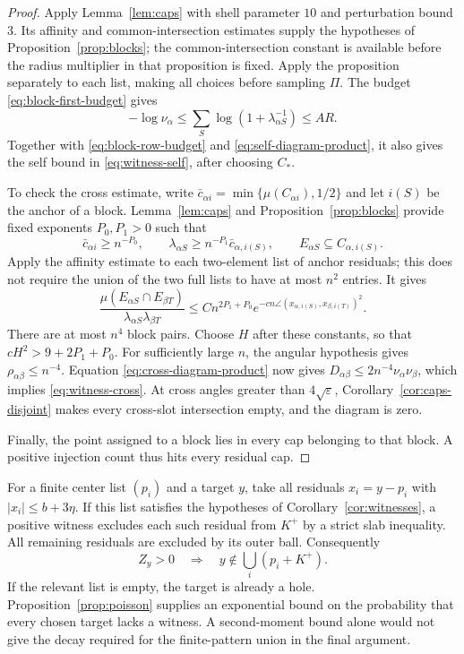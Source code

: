 \begin{proof}
Apply Lemma~\ref{lem:caps} with shell parameter $10$ and perturbation
bound $3$. Its affinity and common-intersection estimates supply the
hypotheses of Proposition~\ref{prop:blocks}; the common-intersection
constant is available before the radius multiplier in that proposition
is fixed. Apply the proposition separately to each list, making all
choices before sampling $\Pi$. The budget
\eqref{eq:block-first-budget} gives
\[
 -\log\nu_\alpha
 \le\sum_S\log(1+\lambda_{\alpha S}^{-1})\le AR.
\]
Together with \eqref{eq:block-row-budget} and
\eqref{eq:self-diagram-product}, it also gives the self bound in
\eqref{eq:witness-self}, after choosing $C_*$.

To check the cross estimate, write
$\bar c_{\alpha i}=\min\{\mu(C_{\alpha i}),1/2\}$ and let
$i(S)$ be the anchor of a block. Lemma~\ref{lem:caps} and
Proposition~\ref{prop:blocks} provide fixed exponents $P_0,P_1>0$
such that
\[
 \bar c_{\alpha i}\ge n^{-P_0},\qquad
 \lambda_{\alpha S}\ge n^{-P_1}\bar c_{\alpha,i(S)},\qquad
 E_{\alpha S}\subseteq C_{\alpha,i(S)}.
\]
Apply the affinity estimate to each two-element list of anchor residuals;
this does not require the union of the two full lists to have at most
$n^2$ entries. It gives
\[
 \frac{\mu(E_{\alpha S}\cap E_{\beta T})}
      {\lambda_{\alpha S}\lambda_{\beta T}}
 \le Cn^{2P_1+P_0}
       e^{-c n\angle(x_{\alpha,i(S)},x_{\beta,i(T)})^2}.
\]
There are at most $n^4$ block pairs. Choose $H$ after these constants,
so that $cH^2>9+2P_1+P_0$. For sufficiently large $n$, the angular
hypothesis gives $\rho_{\alpha\beta}\le n^{-4}$. Equation
\eqref{eq:cross-diagram-product} now gives
$D_{\alpha\beta}\le2n^{-4}\nu_\alpha\nu_\beta$, which implies
\eqref{eq:witness-cross}. At cross angles greater than
$4\sqrt\varepsilon$, Corollary~\ref{cor:caps-disjoint}
makes every cross-slot intersection empty, and the diagram is zero.

Finally, the point assigned to a block lies in every cap belonging to
that block. A positive injection count thus hits every residual cap.
\end{proof}

For a finite center list $(p_i)$ and a target $y$, take all residuals
$x_i=y-p_i$ with $|x_i|\le b+3\eta$. If this list satisfies the
hypotheses of Corollary~\ref{cor:witnesses}, a positive witness excludes
each such residual from $K^+$ by a strict slab inequality. All remaining
residuals are excluded by its outer ball. Consequently
\begin{equation}
 Z_y>0\quad\Longrightarrow\quad
 y\notin\bigcup_i(p_i+K^+).
 \label{eq:witness-hole}
\end{equation}
If the relevant list is empty, the target is already a hole.
Proposition~\ref{prop:poisson} supplies an exponential bound on the
probability that every chosen target lacks a witness. A second-moment
bound alone would not give the decay required for the finite-pattern
union in the final argument.
